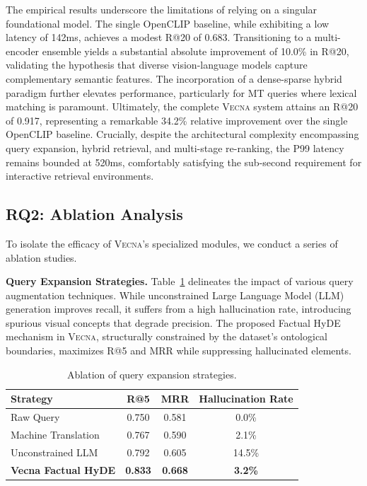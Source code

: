 The empirical results underscore the limitations of relying on a singular foundational model. The single OpenCLIP baseline, while exhibiting a low latency of 142ms, achieves a modest R@20 of 0.683. Transitioning to a multi-encoder ensemble yields a substantial absolute improvement of 10.0\% in R@20, validating the hypothesis that diverse vision-language models capture complementary semantic features. The incorporation of a dense-sparse hybrid paradigm further elevates performance, particularly for MT queries where lexical matching is paramount. Ultimately, the complete \textsc{Vecna} system attains an R@20 of 0.917, representing a remarkable 34.2\% relative improvement over the single OpenCLIP baseline. Crucially, despite the architectural complexity encompassing query expansion, hybrid retrieval, and multi-stage re-ranking, the P99 latency remains bounded at 520ms, comfortably satisfying the sub-second requirement for interactive retrieval environments.

\subsection{RQ2: Ablation Analysis}

To isolate the efficacy of \textsc{Vecna}'s specialized modules, we conduct a series of ablation studies.

\textbf{Query Expansion Strategies.} Table~\ref{tab:ablation_expansion} delineates the impact of various query augmentation techniques. While unconstrained Large Language Model (LLM) generation improves recall, it suffers from a high hallucination rate, introducing spurious visual concepts that degrade precision. The proposed Factual HyDE mechanism in \textsc{Vecna}, structurally constrained by the dataset's ontological boundaries, maximizes R@5 and MRR while suppressing hallucinated elements.

\begin{table}[t]
\centering
\caption{Ablation of query expansion strategies.}
\label{tab:ablation_expansion}
\begin{tabular}{lccc}
\toprule
\textbf{Strategy} & \textbf{R@5} & \textbf{MRR} & \textbf{Hallucination Rate} \\
\midrule
Raw Query & 0.750 & 0.581 & 0.0\% \\
Machine Translation & 0.767 & 0.590 & 2.1\% \\
Unconstrained LLM & 0.792 & 0.605 & 14.5\% \\
\textbf{Vecna Factual HyDE} & \textbf{0.833} & \textbf{0.668} & \textbf{3.2\%} \\
\bottomrule
\end{tabular}
\vspace{-2mm}
\end{table}

